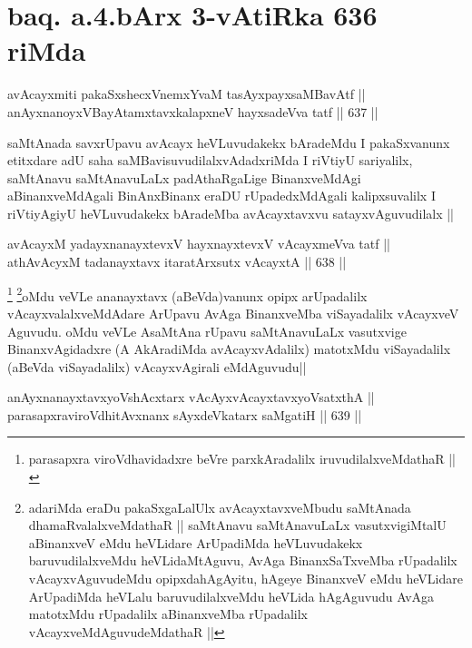 \section*{baq. a.4.bArx 3-vAtiRka 636 riMda}

\begin{shl}
avAcayxmiti pakaSxshecxVnemxYvaM tasAyxpayxsaMBavAtf ||  \\
anAyxnanoyxVBayAtamxtavxkalapxneV hayxsadeVva tatf ||  637 ||  
\end{shl}

\begin{artha}
saMtAnada savxrUpavu avAcayx heVLuvudakekx bAradeMdu I pakaSxvanunx etitxdare adU saha saMBavisuvudilalxvAdadxriMda I riVtiyU sariyalilx, saMtAnavu saMtAnavuLaLx padAthaRgaLige BinanxveMdAgi aBinanxveMdAgali BinAnxBinanx eraDU rUpadedxMdAgali kalipxsuvalilx I riVtiyAgiyU heVLuvudakekx bAradeMba avAcayxtavxvu satayxvAguvudilalx ||
\end{artha}

\begin{shl}
avAcayxM yadayxnanayxtevxV hayxnayxtevxV vAcayxmeVva tatf || \\
athAvAcyxM tadanayxtavx itaratArxsutx vAcayxtA ||  638 ||  
\end{shl}

\begin{artha}
\footnote{parasapxra viroVdhavidadxre beVre parxkAradalilx iruvudilalxveMdathaR ||}
\footnote{adariMda eraDu pakaSxgaLalUlx avAcayxtavxveMbudu saMtAnada dhamaRvalalxveMdathaR || saMtAnavu saMtAnavuLaLx vasutxvigiMtalU aBinanxveV eMdu heVLidare ArUpadiMda heVLuvudakekx baruvudilalxveMdu heVLidaMtAguvu, AvAga BinanxSaTxveMba rUpadalilx vAcayxvAguvudeMdu opipxdahAgAyitu, hAgeye BinanxveV eMdu heVLidare ArUpadiMda heVLalu baruvudilalxveMdu heVLida hAgAguvudu AvAga matotxMdu rUpadalilx aBinanxveMba rUpadalilx vAcayxveMdAguvudeMdathaR ||}oMdu veVLe ananayxtavx (aBeVda)vanunx opipx arUpadalilx vAcayxvalalxveMdAdare ArUpavu AvAga BinanxveMba viSayadalilx vAcayxveV Aguvudu. oMdu veVLe AsaMtAna rUpavu saMtAnavuLaLx vasutxvige BinanxvAgidadxre (A AkAradiMda avAcayxvAdalilx) matotxMdu viSayadalilx (aBeVda viSayadalilx) vAcayxvAgirali eMdAguvudu||
\end{artha}

\begin{shl}
anAyxnanayxtavxyoVshAcxtarx vAcAyxvAcayxtavxyoVsatxthA ||  \\
parasapxraviroVdhitAvxnanx sAyxdeVkatarx saMgatiH ||  639 ||  
\end{shl}

